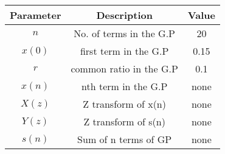 \renewcommand{\arraystretch}{1.5}
\begin{tabular}{|c|c|c|}
\hline
Parameter & Description & Value \\\hline
\( n \) & No. of terms in the G.P &20 \\\hline
\(x(0) \) & first term in the G.P&0.15 \\\hline
\( r \) & common ratio in the G.P& 0.1 \\\hline
\( x(n) \) & nth term in the G.P& none \\\hline
\( X(z) \) & Z transform of x(n)& none \\\hline
\( Y(z) \) & Z transform of s(n)& none \\\hline
\(s(n)\)& Sum of n terms of GP& none\\\hline
\end{tabular}
